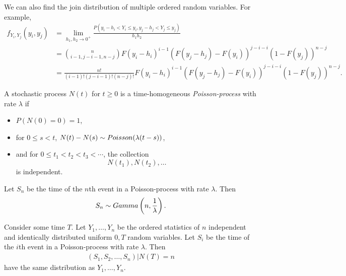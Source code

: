 We can also find the join distribution of multiple ordered random variables. For example,
\begin{align*}
    f_{Y_i,Y_j}(y_i, y_j) &= \lim_{h_1, h_2 \to 0^+}\frac{P(y_i - h_i < Y_i \leq y_i, y_j - h_j < Y_j \leq y_j)}{h_1h_2} \\
    &= \binom{n}{i-1, j-i-1, n-j}F(y_i-h_i)^{i-1}\left(F(y_j-h_j)-F(y_i)\right)^{j-i-i}\left(1-F(y_j)\right)^{n-j} \\
    &= \frac{n!}{(i-1)!(j-i-1)!(n-j)!}F(y_i-h_i)^{i-1}\left(F(y_j-h_j)-F(y_i)\right)^{j-i-i}\left(1-F(y_j)\right)^{n-j}.
\end{align*}

\begin{defn} A stochastic process $N(t)$ for $t \geq 0$ is a time-homogeneous \emph{Poisson-process} with rate $\lambda$ if
    \begin{itemize}
        \item $P(N(0) = 0) = 1$,
        \item for $0 \leq s < t$, $N(t) - N(s) \sim Poisson(\lambda(t-s))$,
        \item and for $0 \leq t_1 < t_2 < t_3 < \cdots$, the collection \[N(t_1), N(t_2), \ldots\] is independent.
    \end{itemize}
\end{defn}

\begin{rmk}
    Let $S_n$ be the time of the $n$th event in a Poisson-process with rate $\lambda$. Then
    \begin{align*}
        S_n \sim Gamma\left(n, \frac{1}{\lambda}\right).
    \end{align*}
\end{rmk}

\begin{prop}
    Consider some time $T$. Let $Y_1, \ldots, Y_n$ be the ordered statistics of $n$ independent and identically distributed uniform $0, T$ random variables. Let $S_i$ be the time of the $i$th event in a Poisson-process with rate $\lambda$. Then
    \begin{align*}
        (S_1, S_2, \ldots, S_n) | N(T) = n
    \end{align*} 
    have the same distribution as $Y_1, \ldots, Y_n$.
\end{prop}

